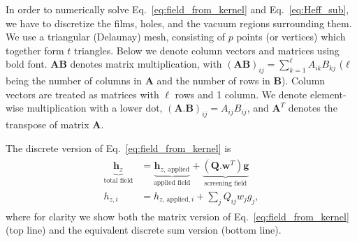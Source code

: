 \documentclass[final,3p,times,twocolumn]{elsarticle}
\begin{document}
In order to numerically solve Eq.~\ref{eq:field_from_kernel} and Eq.~\ref{eq:Heff_sub}, we have to discretize the films, holes, and the vacuum regions surrounding them. We use a triangular
(Delaunay) mesh, consisting of $p$ points (or vertices)
which together form $t$ triangles. Below we denote column vectors and matrices using bold font. $\mathbf{A}\mathbf{B}$
denotes matrix multiplication, with $(\mathbf{A}\mathbf{B})_{ij}=\sum_{k=1}^\ell A_{ik}B_{kj}$
($\ell$ being the number of columns in $\mathbf{A}$ and the number of rows in $\mathbf{B}$). Column vectors are treated as matrices with $\ell$ rows and 1 column. We denote element-wise multiplication with a lower dot, $(\mathbf{A}.\mathbf{B})_{ij}=A_{ij}B_{ij}$, and $\mathbf{A}^T$ denotes the transpose of matrix $\mathbf{A}$.

The discrete version of Eq.~\ref{eq:field_from_kernel} is
\begin{align}
\begin{split}
    \label{eq:field_from_kernel_num}
    \underbrace{\mathbf{h}_z}_\text{total field}
    &= \underbrace{\mathbf{h}_{z,\,\mathrm{applied}}}_\text{applied field}
    + \underbrace{(\mathbf{Q}.\mathbf{w}^T)\mathbf{g}}_\text{screening field}\\
    h_{z, i} &= h_{z,\,\mathrm{applied}, i} + \sum_j Q_{ij}w_jg_j,
\end{split}
\end{align}
where for clarity we show both the matrix version of Eq.~\ref{eq:field_from_kernel} (top line) and the equivalent discrete sum version (bottom line).
\end{document}
